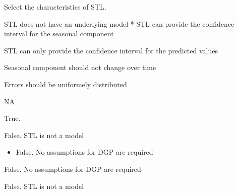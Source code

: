 
\begin{question}
Select the characteristics of STL.
\begin{answerlist}
  \item STL does not have an underlying model * STL can provide the confidence interval for the seasonal component
  \item STL can only provide the confidence interval for the predicted values
  \item Seasonal component should not change over time
  \item Errors should be uniformely distributed
  \item NA
\end{answerlist}
\end{question}

\begin{solution}
\begin{answerlist}
  \item True.
  \item False. STL is not a model
  \item \begin{itemize}
\tightlist
\item
  False. No assumptions for DGP are required
\end{itemize}
  \item False. No assumptions for DGP are required
  \item False. STL is not a model
\end{answerlist}
\end{solution}

